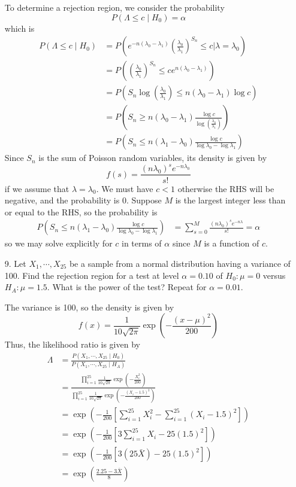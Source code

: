 \documentclass{article}
\begin{document}
\begin{itemize}
\begin{soln}
			To determine a rejection region, we consider the probability \[P(\Lambda\le c\mid H_0)=\alpha\] which is
			\begin{align*}
				P(\Lambda\le c\mid H_0) &= P\left( e^{-n(\lambda_0-\lambda_1)} \left( \frac{\lambda_0}{\lambda_1} \right)^{S_n} \le c\bigg\vert \lambda=\lambda_0 \right) \\
				&= P\left( \left( \frac{\lambda_0}{\lambda_1} \right)^{S_n}\le ce^{n(\lambda_0-\lambda_1)} \right) \\
				&= P\left( S_n\log \left( \frac{\lambda_0}{\lambda_1}\right)\le n(\lambda_0-\lambda_1) \log c  \right) \\
				&= P\left( S_n\ge n(\lambda_0-\lambda_1)\frac{\log c}{\log \left( \frac{\lambda_0}{\lambda_1} \right)} \right) \\
				&= P\left( S_n\le n(\lambda_1-\lambda_0) \frac{\log c}{\log \lambda_0-\log \lambda_1} \right)	
			\end{align*} Since $S_n$ is the sum of Poisson random variables, its density is given by \[f(s) = \frac{(n\lambda_0)^s e^{-n\lambda_0}}{s!}\] if we assume that $\lambda=\lambda_0.$ We must have $c<1$ otherwise the RHS will be negative, and the probability is 0. Suppose $M$ is the largest integer less than or equal to the RHS, so the probability is 
			\begin{align*}
				P\left( S_n\le n(\lambda_1-\lambda_0) \frac{\log c}{\log \lambda_0-\log \lambda_1} \right) &= \sum_{s=0}^{M} \frac{(n\lambda_0)^s e^{-n\lambda}}{s!}=\alpha
			\end{align*} so we may solve explicitly for $c$ in terms of $\alpha$ since $M$ is a function of $c.$ 

		\end{soln}

	\item[9.] Let $X_1,\cdots, X_{25}$ be a sample from a normal distribution having a variance of 100. Find the rejection region for a test at level $\alpha=0.10$ of $H_0:\mu=0$ versus $H_A: \mu=1.5.$ What is the power of the test? Repeat for $\alpha=0.01.$
		\begin{soln}
			The variance is 100, so the density is given by \[f(x) = \frac{1}{10\sqrt{2\pi}}\exp\left( -\frac{(x-\mu)^2}{200} \right)\] Thus, the likelihood ratio is given by
			\begin{align*}
				\Lambda &= \frac{P(X_1, \cdots, X_{25}\mid H_0)}{P(X_1, \cdots, X_{25}\mid H_A)} \\
				&= \frac{\displaystyle \prod_{i=1}^{25}\frac{1}{10\sqrt{2\pi}}\exp\left( -\frac{X_i^2}{200} \right)}{\displaystyle \prod_{i=1}^{25} \frac{1}{10\sqrt{2\pi}}\exp\left( -\frac{(X_i-1.5)^2}{200} \right)} \\
				&= \exp\left( -\frac{1}{200}\left[ \sum_{i=1}^{25}X_i^2 - \sum_{i=1}^{25}(X_i-1.5)^2 \right] \right) \\
				&= \exp\left( -\frac{1}{200}\left[ 3\sum_{i=1}^{25}X_i - 25(1.5)^2 \right] \right) \\
				&= \exp\left( -\frac{1}{200}\left[ 3(25\bar{X})-25(1.5)^2 \right] \right) \\
				&= \exp\left( \frac{2.25-3\bar{X}}{8} \right)
			\end{align*}


\end{soln}
\end{itemize}
\end{document}
